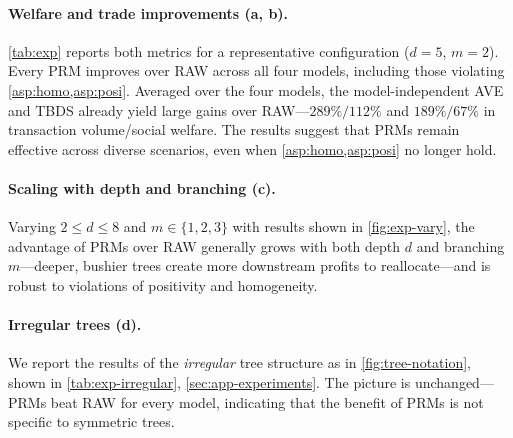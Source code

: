 \paragraph{Welfare and trade improvements (a, b).}
\cref{tab:exp} reports both metrics for a representative configuration ($d=5$, $m=2$). Every PRM improves over RAW across all four models, including those violating \cref{asp:homo,asp:posi}. Averaged over the four models, the model-independent AVE and TBDS already yield large gains over RAW---$289\%/112\%$ and $189\%/67\%$ in transaction volume/social welfare.
The results suggest that PRMs remain effective across diverse scenarios, even when \cref{asp:homo,asp:posi} no longer hold.




\paragraph{Scaling with depth and branching (c).}
Varying $2 \le d\le 8$ and $m\in\{1,2,3\}$ with results shown in \cref{fig:exp-vary}, the advantage of PRMs over RAW generally grows with both depth $d$ and branching $m$---deeper, bushier trees create more downstream profits to reallocate---and is robust to violations of positivity and homogeneity.

\paragraph{Irregular trees (d).}
We report the results of the \emph{irregular} tree structure as in \cref{fig:tree-notation}, shown in \cref{tab:exp-irregular}, \cref{sec:app-experiments}. The picture is unchanged---PRMs beat RAW for every model, indicating that the benefit of PRMs is not specific to symmetric trees.
